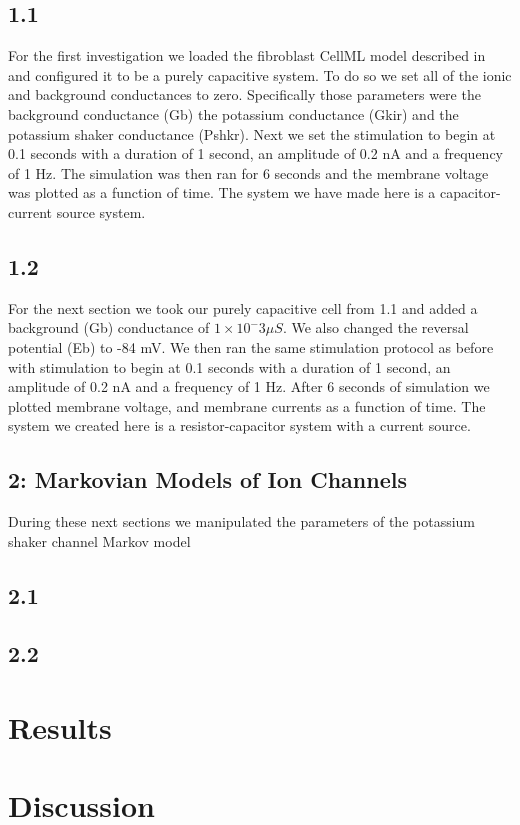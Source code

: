 \documentclass[11pt]{article}
\begin{document}
\subsection{1.1}

For the first investigation we loaded the fibroblast CellML model described in \cite{Sachse2008} and configured it to be a purely capacitive system. To do so we set all of the ionic and background conductances to zero. Specifically those parameters were the background conductance (Gb) the potassium conductance (Gkir) and the potassium shaker conductance (Pshkr). Next we set the stimulation to begin at 0.1 seconds with a duration of 1 second, an amplitude of 0.2 nA and a frequency of 1 Hz. The simulation was then ran for 6 seconds and the membrane voltage was plotted as a function of time. The system we have made here is a capacitor-current source system. 

\subsection{1.2}
For the next section we took our purely capacitive cell from 1.1 and added a background (Gb) conductance of \ensuremath{1\times{}10^-3\mu S}. We also changed the reversal potential (Eb) to -84 mV. We then ran the same stimulation protocol as before with stimulation to begin at 0.1 seconds with a duration of 1 second, an amplitude of 0.2 nA and a frequency of 1 Hz. After 6 seconds of simulation we plotted membrane voltage, and membrane currents as a function of time. The system we created here is a resistor-capacitor system with a current source.

\subsection{2: Markovian Models of Ion Channels}
During these next sections we manipulated the parameters of the potassium shaker channel Markov model

\subsection{2.1}

\subsection{2.2}

\section{Results}


\section{Discussion} 





\end{document}
